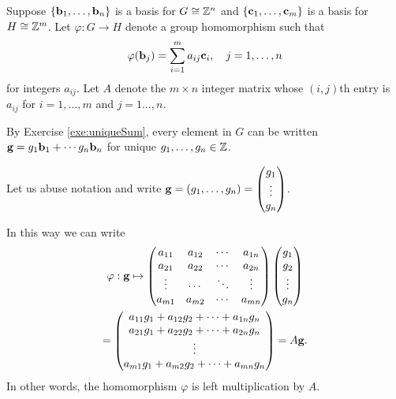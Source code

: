 \documentclass[../algebraNotesMSRI-UP2016.tex]{subfiles}
\begin{document}
\begin{frame}
Suppose $\{\mathbf b_1,\dots,\mathbf b_n\}$ is a basis for $G\cong \mathbb Z^n$ and $\{\mathbf c_1,\dots,\mathbf c_m\}$ is a basis for $H\cong \mathbb Z^m$.  Let $\varphi:G\to H$ denote a group homomorphism such that  
\[
\varphi{(\mathbf b_j)}=\sum_{i=1}^ma_{ij}\mathbf c_i,\quad j=1,\dots,n
\]
for integers $a_{ij}$.  Let $A$ denote the $m\times n$ integer matrix whose $(i,j)$th entry is $a_{ij}$ for $i=1,\dots,m$ and $j=1\dots, n$.

\smallGap
By Exercise \ref{exe:uniqueSum}, every element in $G$ can be written $\mathbf g=g_1\mathbf b_1+\cdots g_n\mathbf b_n$ for unique $g_1,\dots, g_n\in \mathbb Z$.  

\vspace{-0.5pc}
Let us abuse notation and write 
$\mathbf g=(g_1,\dots,g_n)
	=\begin{pmatrix}
	g_1 \\
	\vdots \\
	g_n
	\end{pmatrix}
$.
\end{frame}

\begin{frame}{}{}
In this way we can write
\begin{multline*}
\varphi:\mathbf g \mapsto 
	\begin{pmatrix}
		a_{11} & a_{12} & \cdots & a_{1n} \\
		a_{21} & a_{22} & \cdots & a_{2n} \\
		\vdots & \cdots & \ddots & \vdots \\
		a_{m1} & a_{m2} & \cdots & a_{mn}
		\end{pmatrix}
	\begin{pmatrix}
		g_1 \\
		g_2 \\
		\vdots \\
		g_n\end{pmatrix}
	\\	
	= \begin{pmatrix}
		a_{11}g_1+a_{12}g_2+\cdots +a_{1n}g_n \\
		a_{21}g_1+a_{22}g_2+\cdots +a_{2n}g_n \\
		\vdots \\
		a_{m1}g_1+a_{m2}g_2+\cdots +a_{mn}g_n 
		\end{pmatrix} 
	= A\mathbf g.
\end{multline*}
In other words, the homomorphism $\varphi$ is left multiplication by $A$.  
\end{frame}
\end{document}
